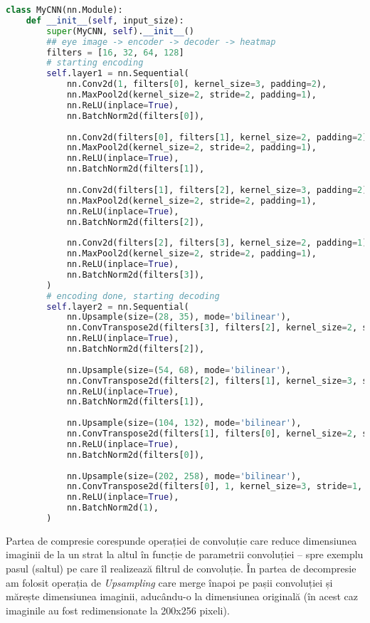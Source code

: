 \begin{lstlisting}[language=python]
class MyCNN(nn.Module):
    def __init__(self, input_size):
        super(MyCNN, self).__init__()
        ## eye image -> encoder -> decoder -> heatmap
        filters = [16, 32, 64, 128]
        # starting encoding
        self.layer1 = nn.Sequential(
            nn.Conv2d(1, filters[0], kernel_size=3, padding=2),
            nn.MaxPool2d(kernel_size=2, stride=2, padding=1),
            nn.ReLU(inplace=True),
            nn.BatchNorm2d(filters[0]),
            
            nn.Conv2d(filters[0], filters[1], kernel_size=2, padding=2),
            nn.MaxPool2d(kernel_size=2, stride=2, padding=1),
            nn.ReLU(inplace=True),
            nn.BatchNorm2d(filters[1]),
            
            nn.Conv2d(filters[1], filters[2], kernel_size=3, padding=2),
            nn.MaxPool2d(kernel_size=2, stride=2, padding=1),
            nn.ReLU(inplace=True),
            nn.BatchNorm2d(filters[2]),
            
            nn.Conv2d(filters[2], filters[3], kernel_size=2, padding=1),
            nn.MaxPool2d(kernel_size=2, stride=2, padding=1),
            nn.ReLU(inplace=True),
            nn.BatchNorm2d(filters[3]),
        )
        # encoding done, starting decoding
        self.layer2 = nn.Sequential(
            nn.Upsample(size=(28, 35), mode='bilinear'),
            nn.ConvTranspose2d(filters[3], filters[2], kernel_size=2, stride=1, padding=1),
            nn.ReLU(inplace=True),
            nn.BatchNorm2d(filters[2]),
            
            nn.Upsample(size=(54, 68), mode='bilinear'),
            nn.ConvTranspose2d(filters[2], filters[1], kernel_size=3, stride=1, padding=2),
            nn.ReLU(inplace=True),
            nn.BatchNorm2d(filters[1]),
            
            nn.Upsample(size=(104, 132), mode='bilinear'),
            nn.ConvTranspose2d(filters[1], filters[0], kernel_size=2, stride=1, padding=2),
            nn.ReLU(inplace=True),
            nn.BatchNorm2d(filters[0]),
        
            nn.Upsample(size=(202, 258), mode='bilinear'),
            nn.ConvTranspose2d(filters[0], 1, kernel_size=3, stride=1, padding=2),
            nn.ReLU(inplace=True),
            nn.BatchNorm2d(1),
        )
\end{lstlisting}

Partea de compresie corespunde operației de convoluție care reduce dimensiunea imaginii de la un strat la altul în funcție de parametrii convoluției – spre exemplu pasul (saltul) pe care îl realizează filtrul de convoluție.
În partea de decompresie am folosit operația de \emph{Upsampling} care merge înapoi pe pașii convoluției și mărește dimensiunea imaginii, aducându-o la dimensiunea originală (în acest caz imaginile au fost redimensionate la 200x256 pixeli).

